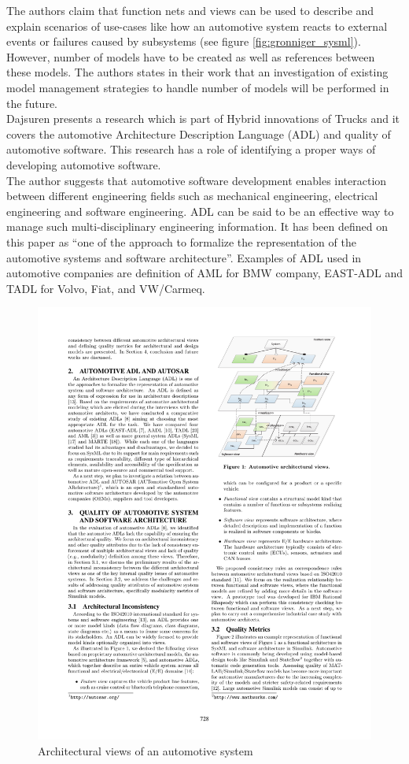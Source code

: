 The authors claim that function nets and views can be used to describe and explain scenarios of use-cases like how an automotive system reacts to external events or failures caused by subsystems (see figure \ref{fig:gronniger_sysml}). However, number of models have to be created as well as references between these models. The authors states in their work that an investigation of existing model management strategies to handle number of models will be performed in the future.\\

Dajsuren \cite{Dajsuren} presents a research which is part of Hybrid innovations of Trucks and it covers the automotive Architecture Description Language (ADL) and quality of automotive software. This research has a role of identifying a proper ways of developing automotive software. \\

The author suggests that automotive software development enables interaction between different engineering fields such as mechanical engineering, electrical engineering and software engineering. ADL can be said to be an effective way to manage such multi-disciplinary engineering information. It has been defined on this paper as ``one of the approach to formalize the representation of the automotive systems and software architecture''. Examples of ADL used in automotive companies are definition of AML for BMW company, EAST-ADL and TADL for Volvo, Fiat, and VW/Carmeq. \\

\begin{figure}[H]
\centering
\captionsetup{justification=centering}
\vspace{0cm}%
\includegraphics[width=0.5\linewidth]{figure/literatures/dajsuren_adl.pdf}
\caption{Architectural views of an automotive system \cite{Dajsuren}}
\label{fig:dajsuren_adl}
\end{figure}

